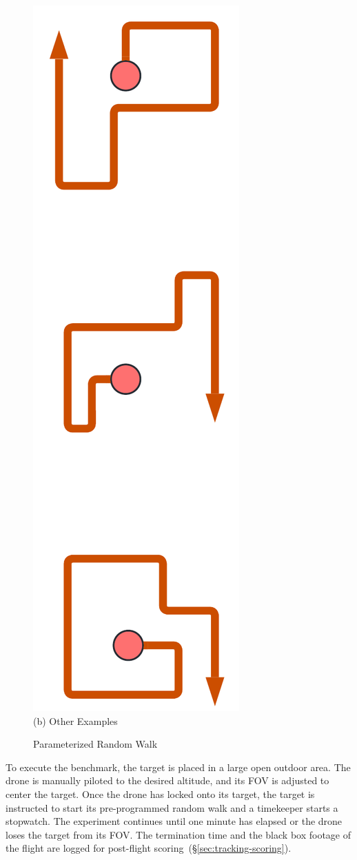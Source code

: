 \begin{figure}
\begin{minipage}{0.35\linewidth}
\includegraphics[width=0.35\linewidth]{chapter6/FIGS/fig-tracking-manypaths.png}\\
{(b) Other Examples}

\end{minipage}
\caption{Parameterized Random Walk}
\label{fig:tracking-path}
\end{figure}


To execute the benchmark, the target is placed in a large open outdoor
area.  The drone is manually piloted to the desired altitude, and its
FOV is adjusted to center the target. Once the drone has locked
onto its target, the target is instructed to start its pre-programmed
random walk and a timekeeper starts a stopwatch. The experiment
continues until one minute has elapsed or the drone loses the target
from its FOV.  The termination time and the black box footage of the
flight are logged for post-flight
scoring~(\S\ref{sec:tracking-scoring}).

